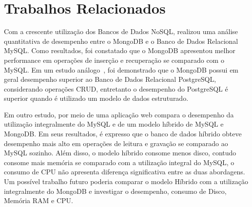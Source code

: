 \documentclass[12pt]{article}
\begin{document}



\section{Trabalhos Relacionados} 
\label{section:relacionados}

Com a crescente utilização dos Bancos de Dados NoSQL, \cite{patil:2017} realizou uma análise quantitativa de desempenho entre o MongoDB e o Banco de Dados Relacional MySQL. Como resultados, foi constatado que o MongoDB apresentou melhor performance em operações de inserção e recuperação se comparado com o MySQL. Em um estudo análogo~\cite{jung:2015}, foi demonstrado que o MongoDB possui em geral desempenho superior ao Banco de Dados Relacional PostgreSQL, considerando operações CRUD, entretanto o desempenho do PostgreSQL é superior quando é utilizado um modelo de dados estruturado.

Em outro estudo, \cite{ongo:2018} por meio de uma aplicação web compara o desempenho da utilização integralmente do MySQL e de um modelo híbrido de MySQL e MongoDB. Em seus resultados, é expresso que o banco de dados híbrido obteve desempenho mais alto em operações de leitura e gravação se comparado ao MySQL sozinho. Além disso, o modelo híbrido consome menos disco, contudo consome mais memória se comparado com a utilização integral do MySQL, o consumo de CPU não apresenta diferença significativa entre as duas abordagens. Um possível trabalho futuro poderia comparar o modelo Híbrido com a utilização integralmente do MongoDB e investigar o desempenho, consumo de Disco, Memória RAM e CPU.
\end{document}
